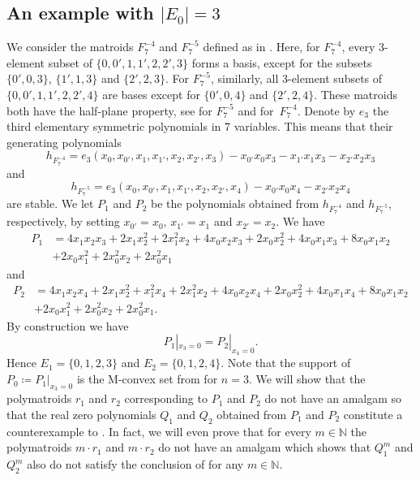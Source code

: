 \documentclass[11pt]{article}
\theoremstyle{definition}
\numberwithin{equation}{section}
\newcommand{\N}{{\mathbb N}}
\begin{document}
\subsection{An example with \texorpdfstring{$|E_0|=3$}{E0=3}}
We consider the matroids $F_7^{-4}$ and $F_7^{-5}$ defined as in . Here, for $F_7^{-4}$, every 3-element subset of $\{0,0',1,1',2,2',3\}$ forms a basis, except for the subsets $\{0',0,3\}$, $\{1',1,3\}$ and $\{2',2,3\}$. For $F_7^{-5}$, similarly, all 3-element subsets of $\{0,0',1,1',2,2',4\}$ are bases except for $\{0',0,4\}$ and $\{2',2,4\}$. These matroids both have the half-plane property, see \cite[\S A.2.2]{HPPlong} for $F_7^{-5}$ and \cite{wagnerwei} for~$F_7^{-4}$. Denote by $e_3$ the third elementary symmetric polynomials in 7 variables. This means that their generating polynomials
\begin{equation*}
    h_{F_7^{-4}}=e_3(x_0,x_{0'},x_1,x_{1'},x_2,x_{2'},x_3)-x_{0'}x_0x_3-x_{1'}x_1x_3-x_{2'}x_2x_3
\end{equation*}
and
\begin{equation*}
    h_{F_7^{-5}}=e_3(x_0,x_{0'},x_1,x_{1'},x_2,x_{2'},x_4)-x_{0'}x_0x_4-x_{2'}x_2x_4
\end{equation*}
are stable. We let $P_1$ and $P_2$ be the polynomials obtained from $h_{F_7^{-4}}$ and $h_{F_7^{-5}}$, respectively, by setting $x_{0'}=x_0$, $x_{1'}=x_1$ and $x_{2'}=x_2$. We have
\begin{align*}
    P_1&=4x_1x_2x_3+2x_1x_2^2+2x_1^2x_2+4x_0x_2x_3+2x_0x_2^2+4x_0x_1x_3+8x_0x_1x_2\\
    &+2x_0x_1^2+2x_0^2x_2+2x_0^2x_1
\end{align*}
and
\begin{align*}
    P_2&=4x_1x_2x_4+2x_1x_2^2+x_1^2x_4+2x_1^2x_2+4x_0x_2x_4+2x_0x_2^2+4x_0x_1x_4+8x_0x_1x_2\\
    &+2x_0x_1^2+2x_0^2x_2+2x_0^2x_1.
\end{align*}
By construction we have
\begin{equation*}
    P_1|_{x_3=0}=P_2|_{x_4=0}.
\end{equation*}
Hence $E_1=\{0,1,2,3\}$ and $E_2=\{0,1,2,4\}$. Note that the support of $P_0\coloneqq P_1|_{x_3=0}$ is the M-convex set from  for $n=3$. We will show that the polymatroids $r_1$ and $r_2$ corresponding to $P_1$ and $P_2$ do not have an amalgam so that the real zero polynomials $Q_1$ and $Q_2$ obtained from $P_1$ and $P_2$ constitute a counterexample to . In fact, we will even prove that for every $m\in\N$ the polymatroids $m\cdot r_1$ and $m\cdot r_2$ do not have an amalgam which shows that $Q_1^m$ and $Q_2^m$ also do not satisfy the conclusion of  for any $m\in\N$.
\end{document}
